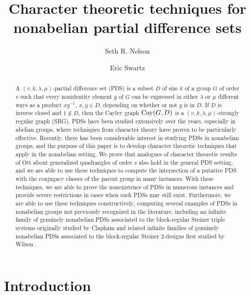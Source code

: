 \documentclass[12pt]{amsproc} %
\theoremstyle{definition}\newtheorem{defn}[thm]{Definition}
\theoremstyle{definition}\newtheorem{rem}[thm]{Remark}
\theoremstyle{definition}\newtheorem{ex}[thm]{Example}
\newcommand{\Cay}{{\rm Cay}}
\begin{document}
\title{Character theoretic techniques for nonabelian partial difference sets}

\author{Seth R. Nelson}
\address{Department of Mathematics, University of Georgia, Athens, GA 30602}

\author{Eric Swartz}
\address{Department of Mathematics, William \& Mary, Williamsburg, VA 23187}

\begin{abstract}
A $(v,k,\lambda, \mu)$-partial difference set (PDS) is a subset $D$ of size $k$ of a group $G$ of order $v$ such that every nonidentity element $g$ of $G$ can be expressed in either $\lambda$ or $\mu$ different ways as a product $xy^{-1}$, $x, y \in D$, depending on whether or not $g$ is in $D$. If $D$ is inverse closed and $1 \notin D$, then the Cayley graph $\Cay(G,D)$ is a $(v,k,\lambda, \mu)$-strongly regular graph (SRG). PDSs have been studied extensively over the years, especially in abelian groups, where techniques from character theory have proven to be particularly effective. Recently, there has been considerable interest in studying PDSs in nonabelian groups, and the purpose of this paper is to develop character theoretic techniques that apply in the nonabelian setting. We prove that analogues of character theoretic results of Ott \cite{ott} about generalized quadrangles of order $s$ also hold in the general PDS setting, and we are able to use these techniques to compute the intersection of a putative PDS with the conjugacy classes of the parent group in many instances. With these techniques, we are able to prove the nonexistence of PDSs in numerous instances and provide severe restrictions in cases when such PDSs may still exist. Furthermore, we are able to use these techniques constructively, computing several examples of PDSs in nonabelian groups not previously recognized in the literature, including an infinite family of genuinely nonabelian PDSs associated to the block-regular Steiner triple systems originally studied by Clapham \cite{clapham} and related infinite families of genuinely nonabelian PDSs associated to the block-regular Steiner $2$-designs first studied by Wilson \cite{wilson}.
\end{abstract}

\maketitle

\section{Introduction}
\end{document}
